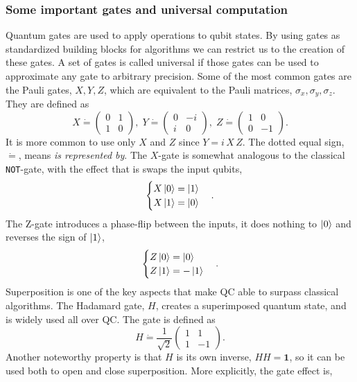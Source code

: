 \subsubsection{Some important gates and universal computation}
Quantum gates are used to apply operations to qubit states. By using gates as standardized building blocks for algorithms we can restrict us to the creation of these gates. A set of gates is called universal if those gates can be used to approximate any gate to arbitrary precision. Some of the most common gates are the Pauli gates, $X, Y, Z$, which are equivalent to the Pauli matrices, $\sigma_x,\sigma_y,\sigma_z$. 
They are defined as
\begin{equation}
X \dot{=}\begin{pmatrix}
0 & 1 \\ 1 & 0
\end{pmatrix},\; 
Y\dot{=}\begin{pmatrix}
0 & -i \\ i & 0
\end{pmatrix},\; 
Z \dot{=} \begin{pmatrix}
1 & 0 \\ 0 & -1
\end{pmatrix}.
\end{equation}
It is more common to use only $X$ and $Z$ since $Y = i\,X\,Z$. The dotted equal sign,$\dot{=}$, means \textit{is represented by}. The $X$-gate is somewhat analogous to the classical {\tt NOT}-gate,  
with the effect that is swaps the input qubits, 
$$\begin{cases} X\ket{0} = \ket{1}\\
X\ket{1} = \ket{0}
\end{cases}.$$
The Z-gate introduces a phase-flip between the inputs, it does nothing to $\ket{0}$ and reverses the sign of $\ket{1}$, $$\begin{cases} Z\ket{0} = \ket{0}\\
Z\ket{1} = -\ket{1}
\end{cases}.$$ 
Superposition is one of the key aspects that make QC able to surpass classical algorithms. The Hadamard gate, $H$, creates a superimposed quantum state, and is widely used all over QC. The gate is defined as
\begin{equation}
H \dot{=} \dfrac{1}{\sqrt{2}}\begin{pmatrix}
1 & 1 \\ 1 & -1
\end{pmatrix}.
\end{equation}
Another noteworthy property is that $H$ is its own inverse, $HH = \mathbf{1}$, so it can be used both to open and close superposition. More explicitly, the gate effect is,
